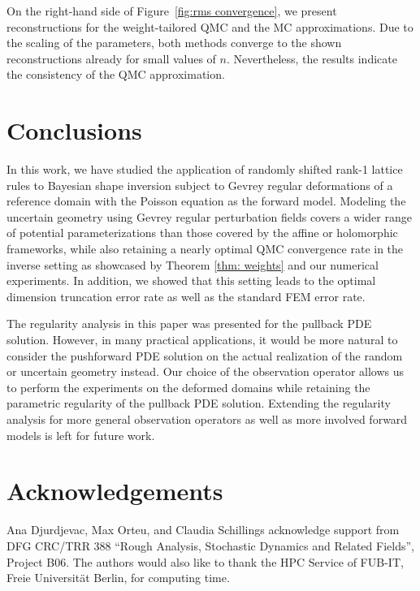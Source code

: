 \documentclass[graybox]{svmult}
\begin{document}
On the right-hand side of Figure~\ref{fig:rms convergence}, we present reconstructions for the weight-tailored QMC and the MC approximations. Due to the scaling of the parameters, both methods converge to the shown reconstructions already for small values of $n$. Nevertheless, the results indicate the consistency of the QMC approximation.

\section{Conclusions}\label{sec:conclusions}

In this work, we have studied the application of randomly shifted rank-1 lattice rules to Bayesian shape inversion subject to Gevrey regular deformations of a reference domain with the Poisson equation as the forward model. Modeling the uncertain geometry using Gevrey regular perturbation fields covers a wider range of potential parameterizations than those covered by the affine or holomorphic frameworks, while also retaining a nearly optimal QMC convergence rate in the inverse setting as showcased by Theorem \ref{thm: weights} and our numerical experiments. In addition, we showed that this setting leads to the optimal dimension truncation error rate as well as the standard FEM error rate.

The regularity analysis in this paper was presented for the pullback PDE solution. However, in many practical applications, it would be more natural to consider the pushforward PDE solution on the actual realization of the random or uncertain geometry instead. Our choice of the observation operator allows us to perform the experiments on the deformed domains while retaining the parametric regularity of the pullback PDE solution. Extending the regularity analysis for more general observation operators as well as more involved forward models is left for future work.

\section*{Acknowledgements}
Ana Djurdjevac, Max Orteu, and Claudia Schillings acknowledge support from DFG CRC/TRR 388 ``Rough
Analysis, Stochastic Dynamics and Related Fields'', Project B06. The authors would also like to thank the HPC Service of FUB-IT, Freie Universit\"at Berlin, for computing time.
\end{document}
